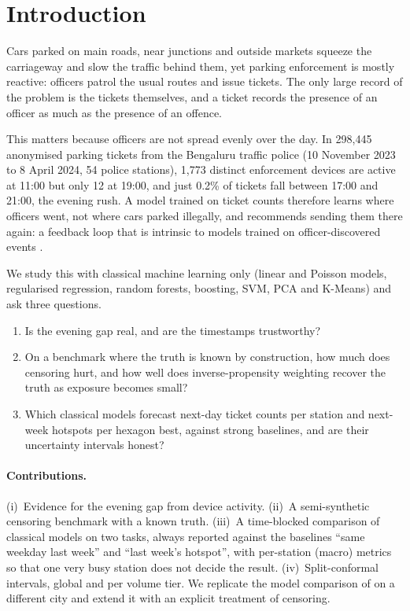 \section{Introduction}
Cars parked on main roads, near junctions and outside markets squeeze the carriageway and slow the traffic behind them, yet parking enforcement is mostly reactive: officers patrol the usual routes and issue tickets. The only large record of the problem is the tickets themselves, and a ticket records the presence of an officer as much as the presence of an offence.

This matters because officers are not spread evenly over the day. In 298{,}445 anonymised parking tickets from the Bengaluru traffic police (10 November 2023 to 8 April 2024, 54 police stations), 1{,}773 distinct enforcement devices are active at 11:00 but only 12 at 19:00, and just 0.2\% of tickets fall between 17:00 and 21:00, the evening rush. A model trained on ticket counts therefore learns where officers went, not where cars parked illegally, and recommends sending them there again: a feedback loop that is intrinsic to models trained on officer-discovered events \citep{ensign2018runaway}.

We study this with classical machine learning only (linear and Poisson models, regularised regression, random forests, boosting, SVM, PCA and K-Means) and ask three questions.
\begin{enumerate}
\item Is the evening gap real, and are the timestamps trustworthy?
\item On a benchmark where the truth is known by construction, how much does censoring hurt, and how well does inverse-propensity weighting recover the truth as exposure becomes small?
\item Which classical models forecast next-day ticket counts per station and next-week hotspots per hexagon best, against strong baselines, and are their uncertainty intervals honest?
\end{enumerate}

\paragraph{Contributions.} (i)~Evidence for the evening gap from device activity. (ii)~A semi-synthetic censoring benchmark with a known truth. (iii)~A time-blocked comparison of classical models on two tasks, always reported against the baselines ``same weekday last week'' and ``last week's hotspot'', with per-station (macro) metrics so that one very busy station does not decide the result. (iv)~Split-conformal intervals, global and per volume tier. We replicate the model comparison of \citet{gao2019parking} on a different city and extend it with an explicit treatment of censoring.

